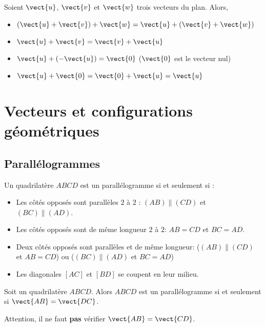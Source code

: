\documentclass{article}
\begin{document}
\begin{proposition}
Soient $\vect{u}$, $\vect{v}$ et $\vect{w}$ trois vecteurs du plan. Alors,
\begin{itemize}
\item $(\vect{u} + \vect{v}) + \vect{w} = \vect{u} + (\vect{v} + \vect{w})$
\item $\vect{u} + \vect{v} = \vect{v} + \vect{u}$
\item $\vect{u} + (- \vect{u}) = \vect{0}$ ($\vect{0}$ est le vecteur nul)
\item $\vect{u} + \vect{0} = \vect{0} + \vect{u} = \vect{u}$
\end{itemize}
\end{proposition}

\newpage

\section{Vecteurs et configurations géométriques}

\subsection{Parallélogrammes}

\begin{tcolorbox}
\begin{definition}[Rappels]
Un quadrilatère $ABCD$ est un parallélogramme si et seulement si :
\begin{itemize}
\item Les côtés opposés sont parallèles $2$ à $2$ : $(AB) \parallel (CD)$ et $(BC) \parallel (AD)$.
\item Les côtés opposés sont de même longueur $2$ à $2$: $AB = CD$ et $BC = AD$.
\item Deux côtés opposés sont parallèles et de même longueur: ($(AB) \parallel (CD)$ et $AB = CD$) ou ($(BC) \parallel (AD)$ et $BC = AD$)
\item Les diagonales $[AC]$ et $[BD]$ se coupent en leur milieu.
\end{itemize} 
\end{definition}
\end{tcolorbox}

\begin{proposition}
Soit un quadrilatère $ABCD$. Alors $ABCD$ est un parallélogramme si et seulement si $\vect{AB} = \vect{DC}$.
\end{proposition}

\begin{tcolorbox}
\begin{remark}
Attention, il ne faut \textbf{pas} vérifier $\vect{AB} = \vect{CD}$.        
\end{remark}
\end{tcolorbox}
\end{document}
